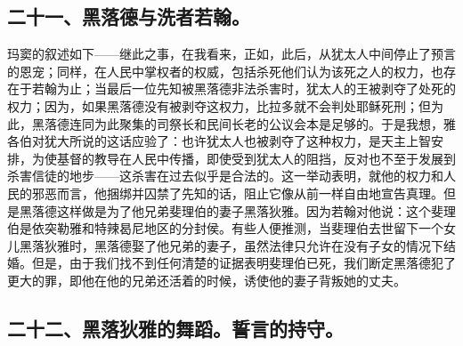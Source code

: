 
\subsection{二十一、黑落德与洗者若翰。}

玛窦的叙述如下——继此之事，在我看来，正如，此后，从犹太人中间停止了预言的恩宠；同样，在人民中掌权者的权威，包括杀死他们认为该死之人的权力，也存在于若翰为止；当最后一位先知被黑落德非法杀害时，犹太人的王被剥夺了处死的权力；因为，如果黑落德没有被剥夺这权力，比拉多就不会判处耶稣死刑；但为此，黑落德连同为此聚集的司祭长和民间长老的公议会本是足够的。于是我想，雅各伯对犹大所说的这话应验了：也许犹太人也被剥夺了这种权力，是天主上智安排，为使基督的教导在人民中传播，即使受到犹太人的阻挡，反对也不至于发展到杀害信徒的地步——这杀害在过去似乎是合法的。这一举动表明，就他的权力和人民的邪恶而言，他捆绑并囚禁了先知的话，阻止它像从前一样自由地宣告真理。但是黑落德这样做是为了他兄弟斐理伯的妻子黑落狄雅。因为若翰对他说：这个斐理伯是依突勒雅和特辣曷尼地区的分封侯。有些人便推测，当斐理伯去世留下一个女儿黑落狄雅时，黑落德娶了他兄弟的妻子，虽然法律只允许在没有子女的情况下结婚。但是，由于我们找不到任何清楚的证据表明斐理伯已死，我们断定黑落德犯了更大的罪，即他在他的兄弟还活着的时候，诱使他的妻子背叛她的丈夫。\par


\subsection{二十二、黑落狄雅的舞蹈。誓言的持守。}

